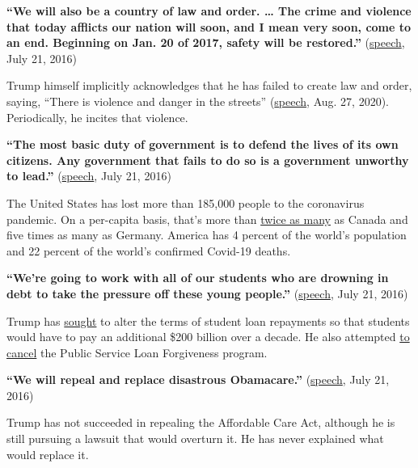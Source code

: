 \textbf{``We will also be a country of law and order. \ldots{} The crime
and violence that today afflicts our nation will soon, and I mean very
soon, come to an end. Beginning on Jan. 20 of 2017, safety will be
restored.''}
(\href{https://www.nytimes3xbfgragh.onion/2016/07/22/us/politics/trump-transcript-rnc-address.html}{speech},
July 21, 2016)

Trump himself implicitly acknowledges that he has failed to create law
and order, saying, ``There is violence and danger in the streets''
(\href{https://www.nytimes3xbfgragh.onion/2020/08/28/us/politics/trump-rnc-speech-transcript.html}{speech},
Aug. 27, 2020). Periodically, he incites that violence.

\textbf{``The most basic duty of government is to defend the lives of
its own citizens. Any government that fails to do so is a government
unworthy to lead.''}
(\href{https://www.nytimes3xbfgragh.onion/2016/07/22/us/politics/trump-transcript-rnc-address.html}{speech},
July 21, 2016)

The United States has lost more than 185,000 people to the coronavirus
pandemic. On a per-capita basis, that's more than
\href{https://ourworldindata.org/grapher/total-covid-deaths-per-million?tab=chart\&year=latest\&country=CAN~USA~DEU\&region=Europe}{twice
as many} as Canada and five times as many as Germany. America has 4
percent of the world's population and 22 percent of the world's
confirmed Covid-19 deaths.

\textbf{``We're going to work with all of our students who are drowning
in debt to take the pressure off these young people.''}
(\href{https://www.nytimes3xbfgragh.onion/2016/07/22/us/politics/trump-transcript-rnc-address.html}{speech},
July 21, 2016)

Trump has
\href{https://www.washingtonpost.com/news/grade-point/wp/2018/02/13/trump-and-devos-call-for-massive-cuts-to-college-student-aid-programs/}{sought}
to alter the terms of student loan repayments so that students would
have to pay an additional \$200 billion over a decade. He also attempted
\href{https://www.nytimes3xbfgragh.onion/2019/03/11/us/politics/trump-budget.html}{to
cancel} the Public Service Loan Forgiveness program.

\textbf{``We will repeal and replace disastrous Obamacare.''}
(\href{https://www.nytimes3xbfgragh.onion/2016/07/22/us/politics/trump-transcript-rnc-address.html}{speech},
July 21, 2016)

Trump has not succeeded in repealing the Affordable Care Act, although
he is still pursuing a lawsuit that would overturn it. He has never
explained what would replace it.

